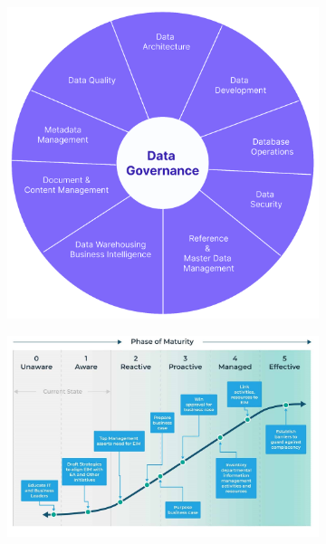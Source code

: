 \documentclass[11pt,a4paper,computermodern]{article}
\begin{document}
\begin{figure}[ht]
	\begin{subfigure}[h]{0.4\linewidth}
		\includegraphics[width=\linewidth]{./figures/DMBoK_v3}
	\end{subfigure}
	\hfill
	\begin{subfigure}[h]{0.58\linewidth}
		\includegraphics[width=\linewidth]{./figures/data_maturity}
	\end{subfigure}
	\label{fig:DataManagement}
\end{figure}
\end{document}
